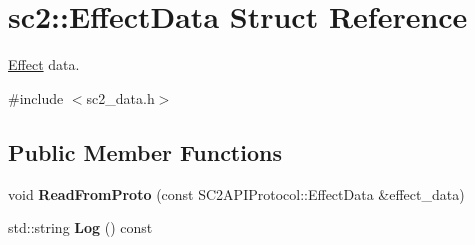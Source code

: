 \hypertarget{structsc2_1_1_effect_data}{}\section{sc2\+:\+:Effect\+Data Struct Reference}
\label{structsc2_1_1_effect_data}


\hyperlink{structsc2_1_1_effect}{Effect} data.  




{\ttfamily \#include $<$sc2\+\_\+data.\+h$>$}

\subsection*{Public Member Functions}
\begin{DoxyCompactItemize}
\item 
\mbox{\label{structsc2_1_1_effect_data_a5bbd650c90658144bd548cb42e024934}} 
void {\bfseries Read\+From\+Proto} (const S\+C2\+A\+P\+I\+Protocol\+::\+Effect\+Data \&effect\+\_\+data)
\item 
\mbox{\label{structsc2_1_1_effect_data_a9381bafb465ba9d2a6c267cff511ee88}} 
std\+::string {\bfseries Log} () const
\end{DoxyCompactItemize}
